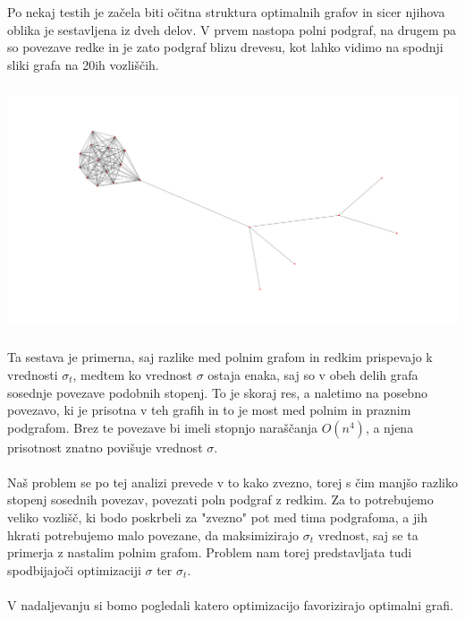 \documentclass[ letterpaper, titlepage, fleqn]{article}
\begin{document}
Po nekaj testih je začela biti očitna struktura optimalnih grafov in sicer
njihova oblika je sestavljena iz dveh delov. V prvem nastopa polni podgraf, 
na drugem pa so povezave redke in je zato podgraf blizu drevesu, kot lahko 
vidimo na spodnji sliki grafa na 20ih vozliščih. \\
\includegraphics[width=\textwidth, height=8cm]{graphics/sample.png} \\
Ta sestava je primerna, saj razlike med polnim grafom in redkim prispevajo 
k vrednosti $\sigma_t$, medtem ko vrednost $\sigma$ ostaja enaka, saj so v obeh
delih grafa sosednje povezave podobnih stopenj. To je skoraj res, a naletimo na posebno povezavo,
ki je prisotna v teh grafih in to je most med polnim in praznim podgrafom. Brez te povezave
bi imeli stopnjo naraščanja $O(n^4)$, a njena prisotnost znatno povišuje vrednost $\sigma$.
\\\\
Naš problem se po tej analizi prevede v to kako zvezno, torej s čim manjšo razliko stopenj sosednih povezav, 
povezati poln podgraf z redkim. 
Za to potrebujemo veliko vozlišč, ki bodo poskrbeli za "zvezno" pot med tima podgrafoma,  
a jih hkrati potrebujemo malo povezane, da maksimizirajo $\sigma_t$ vrednost, saj se ta primerja
z nastalim polnim grafom. Problem nam torej predstavljata tudi spodbijajoči optimizaciji $\sigma$ ter $\sigma_t$.
\\\\
V nadaljevanju si bomo pogledali katero optimizacijo favorizirajo optimalni grafi.
\end{document}
